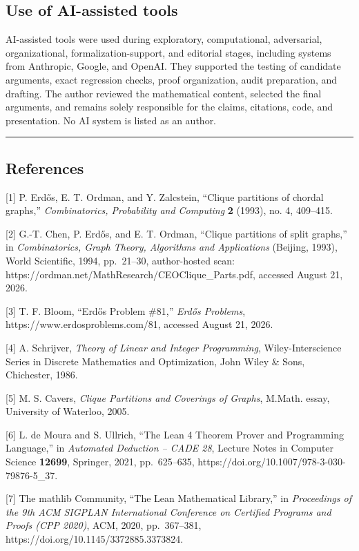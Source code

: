 \documentclass[
  american,
  11pt,
  a4paper,
]{article}
\begin{document}
\subsection{Use of AI-assisted tools}\label{use-of-ai-assisted-tools}

AI-assisted tools were used during exploratory, computational, adversarial, organizational, formalization-support, and editorial stages, including systems from Anthropic, Google, and OpenAI. They supported the testing of candidate arguments, exact regression checks, proof organization, audit preparation, and drafting. The author reviewed the mathematical content, selected the final arguments, and remains solely responsible for the claims, citations, code, and presentation. No AI system is listed as an author.

\begin{center}\rule{0.5\linewidth}{0.5pt}\end{center}

\subsection{References}\label{references}

{[}1{]} P. Erdős, E. T. Ordman, and Y. Zalcstein, ``Clique partitions of chordal graphs,'' \emph{Combinatorics, Probability and Computing} \textbf{2} (1993), no. 4, 409--415.

{[}2{]} G.-T. Chen, P. Erdős, and E. T. Ordman, ``Clique partitions of split graphs,'' in \emph{Combinatorics, Graph Theory, Algorithms and Applications} (Beijing, 1993), World Scientific, 1994, pp.~21--30, author-hosted scan: https://ordman.net/MathResearch/CEOClique\_Parts.pdf, accessed August 21, 2026.

{[}3{]} T. F. Bloom, ``Erdős Problem \#81,'' \emph{Erdős Problems}, https://www.erdosproblems.com/81, accessed August 21, 2026.

{[}4{]} A. Schrijver, \emph{Theory of Linear and Integer Programming}, Wiley-Interscience Series in Discrete Mathematics and Optimization, John Wiley \& Sons, Chichester, 1986.

{[}5{]} M. S. Cavers, \emph{Clique Partitions and Coverings of Graphs}, M.Math. essay, University of Waterloo, 2005.

{[}6{]} L. de Moura and S. Ullrich, ``The Lean 4 Theorem Prover and Programming Language,'' in \emph{Automated Deduction -- CADE 28}, Lecture Notes in Computer Science \textbf{12699}, Springer, 2021, pp.~625--635, https://doi.org/10.1007/978-3-030-79876-5\_37.

{[}7{]} The mathlib Community, ``The Lean Mathematical Library,'' in \emph{Proceedings of the 9th ACM SIGPLAN International Conference on Certified Programs and Proofs (CPP 2020)}, ACM, 2020, pp.~367--381, https://doi.org/10.1145/3372885.3373824.
\end{document}
